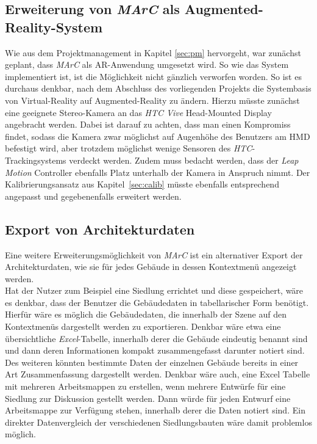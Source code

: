 \subsection{Erweiterung von \emph{MArC} als Augmented-Reality-System} \label{sec:PlanedWebcam}
Wie aus dem Projektmanagement in Kapitel \ref{sec:pm} hervorgeht, war zunächst geplant, dass \textit{MArC} als AR-Anwendung umgesetzt wird. So wie das System implementiert ist, ist die Möglichkeit nicht gänzlich verworfen worden. So ist es durchaus denkbar, nach dem Abschluss des vorliegenden Projekts die Systembasis von Virtual-Reality auf Augmented-Reality zu ändern. Hierzu müsste zunächst eine geeignete Stereo-Kamera an das \textit{HTC Vive} Head-Mounted Display angebracht werden. Dabei ist darauf zu achten, dass man einen Kompromiss findet, sodass die Kamera zwar möglichst auf Augenhöhe des Benutzers am HMD befestigt wird, aber trotzdem möglichst wenige Sensoren des \emph{HTC}-Trackingsystems verdeckt werden. Zudem muss bedacht werden, dass der \textit{Leap Motion} Controller ebenfalls Platz unterhalb der Kamera in Anspruch nimmt. Der Kalibrierungsansatz aus Kapitel~\ref{sec:calib} müsste ebenfalls entsprechend angepasst und gegebenenfalls erweitert werden. 

\subsection{Export von Architekturdaten}
Eine weitere Erweiterungsmöglichkeit von \emph{MArC} ist ein alternativer Export der Architekturdaten, wie sie für jedes Gebäude in dessen Kontextmenü angezeigt werden.\\
Hat der Nutzer zum Beispiel eine Siedlung errichtet und diese gespeichert, wäre es denkbar, dass der Benutzer die Gebäudedaten in tabellarischer Form benötigt. Hierfür wäre es möglich die Gebäudedaten, die innerhalb der Szene auf den Kontextmenüs dargestellt werden zu exportieren. Denkbar wäre etwa eine übersichtliche \emph{Excel}-Tabelle, innerhalb derer die Gebäude eindeutig benannt sind und dann deren Informationen kompakt zusammengefasst darunter notiert sind. Des weiteren könnten bestimmte Daten der einzelnen Gebäude bereits in einer Art Zusammenfassung dargestellt werden. Denkbar wäre auch, eine Excel Tabelle mit mehreren Arbeitsmappen zu erstellen, wenn mehrere Entwürfe für eine Siedlung zur Diskussion gestellt werden. Dann würde für jeden Entwurf eine Arbeitsmappe zur Verfügung stehen, innerhalb derer die Daten notiert sind. Ein direkter Datenvergleich der verschiedenen Siedlungsbauten wäre damit problemlos möglich.

